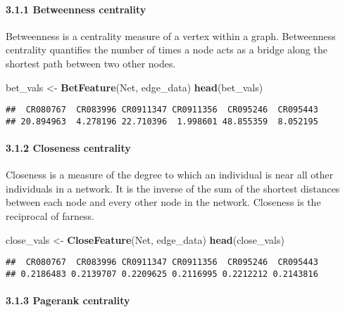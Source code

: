 \documentclass[]{article}
\newenvironment{Shaded}{\begin{snugshade}}{\end{snugshade}}
\newcommand{\KeywordTok}[1]{\textcolor[rgb]{0.13,0.29,0.53}{\textbf{#1}}}
\newcommand{\StringTok}[1]{\textcolor[rgb]{0.31,0.60,0.02}{#1}}
\newcommand{\NormalTok}[1]{#1}
\let\oldparagraph\paragraph
\renewcommand{\paragraph}[1]{\oldparagraph{#1}\mbox{}}
\begin{document}
\paragraph{3.1.1 Betweenness centrality}\label{betweenness-centrality}

Betweenness is a centrality measure of a vertex within a graph.
Betweenness centrality quantifies the number of times a node acts as a
bridge along the shortest path between two other nodes.

\begin{Shaded}
\begin{Highlighting}[]
\NormalTok{bet_vals <-}\StringTok{ }\KeywordTok{BetFeature}\NormalTok{(Net, edge_data)}
\KeywordTok{head}\NormalTok{(bet_vals)}
\end{Highlighting}
\end{Shaded}

\begin{verbatim}
##  CR080767  CR083996 CR0911347 CR0911356  CR095246  CR095443 
## 20.894963  4.278196 22.710396  1.998601 48.855359  8.052195
\end{verbatim}

\paragraph{3.1.2 Closeness centrality}\label{closeness-centrality}

Closeness is a measure of the degree to which an individual is near all
other individuals in a network. It is the inverse of the sum of the
shortest distances between each node and every other node in the
network. Closeness is the reciprocal of farness.

\begin{Shaded}
\begin{Highlighting}[]
\NormalTok{close_vals <-}\StringTok{ }\KeywordTok{CloseFeature}\NormalTok{(Net, edge_data)}
\KeywordTok{head}\NormalTok{(close_vals)}
\end{Highlighting}
\end{Shaded}

\begin{verbatim}
##  CR080767  CR083996 CR0911347 CR0911356  CR095246  CR095443 
## 0.2186483 0.2139707 0.2209625 0.2116995 0.2212212 0.2143816
\end{verbatim}

\paragraph{3.1.3 Pagerank centrality}\label{pagerank-centrality}
\end{document}

